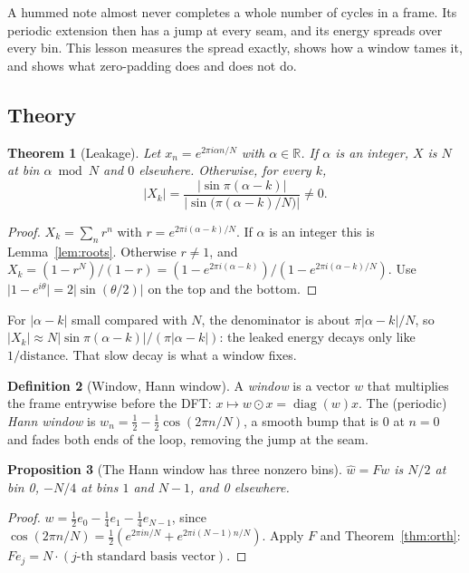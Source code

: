 \documentclass[11pt]{article}
\newtheorem{theorem}{Theorem}[section]
\newtheorem{proposition}[theorem]{Proposition}
\theoremstyle{definition}
\newtheorem{definition}[theorem]{Definition}
\newcommand{\R}{\mathbb{R}}
\newcommand{\abs}[1]{\lvert #1\rvert}
\newcommand{\diag}{\operatorname{diag}}
\begin{document}
A hummed note almost never completes a whole number of cycles in a frame. Its
periodic extension then has a jump at every seam, and its energy spreads over every
bin. This lesson measures the spread exactly, shows how a window tames it, and shows
what zero-padding does and does not do.

\subsection{Theory}

\begin{theorem}[Leakage]\label{thm:leak}
Let $x_n=e^{2\pi i\alpha n/N}$ with $\alpha\in\R$. If $\alpha$ is an integer, $X$ is
$N$ at bin $\alpha\bmod N$ and $0$ elsewhere. Otherwise, for every $k$,
\[
\abs{X_k}=\frac{\abs{\sin\pi(\alpha-k)}}{\abs{\sin\big(\pi(\alpha-k)/N\big)}}\ne0.
\]
\end{theorem}
\begin{proof}
$X_k=\sum_n r^n$ with $r=e^{2\pi i(\alpha-k)/N}$. If $\alpha$ is an integer this is
Lemma~\ref{lem:roots}. Otherwise $r\ne1$, and
$X_k=(1-r^N)/(1-r)=(1-e^{2\pi i(\alpha-k)})/(1-e^{2\pi i(\alpha-k)/N})$. Use
$\abs{1-e^{i\theta}}=2\abs{\sin(\theta/2)}$ on the top and the bottom.
\end{proof}

For $\abs{\alpha-k}$ small compared with $N$, the denominator is about
$\pi\abs{\alpha-k}/N$, so $\abs{X_k}\approx N\abs{\sin\pi(\alpha-k)}/(\pi\abs{\alpha-k})$:
the leaked energy decays only like $1/\text{distance}$. That slow decay is what a
window fixes.

\begin{definition}[Window, Hann window]
A \emph{window} is a vector $w$ that multiplies the frame entrywise before the DFT:
$x\mapsto w\odot x=\diag(w)x$. The (periodic) \emph{Hann window} is
$w_n=\frac12-\frac12\cos(2\pi n/N)$, a smooth bump that is 0 at $n=0$ and fades both
ends of the loop, removing the jump at the seam.
\end{definition}

\begin{proposition}[The Hann window has three nonzero bins]\label{prop:hann}
$\hat w=Fw$ is $N/2$ at bin 0, $-N/4$ at bins $1$ and $N-1$, and 0 elsewhere.
\end{proposition}
\begin{proof}
$w=\frac12e_0-\frac14e_1-\frac14e_{N-1}$, since
$\cos(2\pi n/N)=\frac12(e^{2\pi in/N}+e^{2\pi i(N-1)n/N})$. Apply $F$ and
Theorem~\ref{thm:orth}: $Fe_j=N\cdot(\text{$j$-th standard basis vector})$.
\end{proof}
\end{document}
